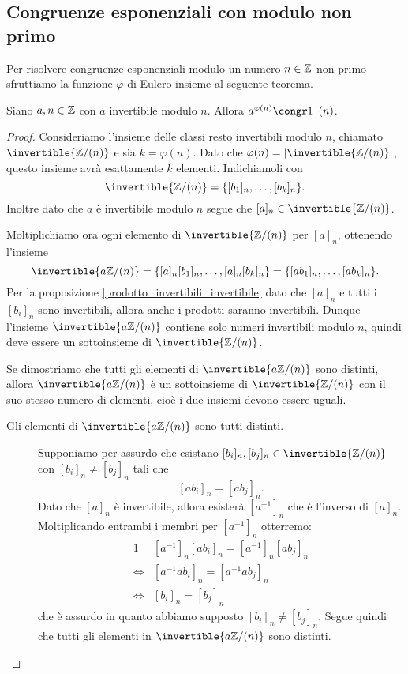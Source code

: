 \subsection{Congruenze esponenziali con modulo non primo}

Per risolvere congruenze esponenziali modulo un numero $n \in \mathbb{Z}$ non primo sfruttiamo la funzione $\varphi$ di Eulero insieme al seguente teorema.

\begin{theorem}
     \label{th_Eulero}
    Siano $a, n \in \mathbb{Z}$ con $a$ invertibile modulo $n$. Allora $a^{\varphi(n)} \congr 1 \Mod{n}$.
\end{theorem}
\begin{proof}
    Consideriamo l'insieme delle classi resto invertibili modulo $n$, chiamato $\invertible{\Z/(n)}$ e sia $k = \varphi(n)$. Dato che $\varphi(n) = \abs{\invertible{\Z/(n)}}$, questo insieme avrà esattamente $k$ elementi. Indichiamoli con \[
        \invertible{\Z/(n)} = \{[b_1]_n, \dots, [b_k]_n\}.   
    \]
    Inoltre dato che $a$ è invertibile modulo $n$ segue che $[a]_n \in \invertible{\Z/(n)}$. 

    Moltiplichiamo ora ogni elemento di $\invertible{\Z/(n)}$ per $[a]_n$, ottenendo l'insieme \[
        \invertible{a\Z/(n)} = \{[a]_n[b_1]_n, \dots, [a]_n[b_k]_n\} = \{[ab_1]_n, \dots, [ab_k]_n\}.
    \]
    Per la proposizione \ref{prodotto_invertibili_invertibile} dato che $[a]_n$ e tutti i $[b_i]_n$ sono invertibili, allora anche i prodotti saranno invertibili. Dunque l'insieme $\invertible{a\Z/(n)}$ contiene solo numeri invertibili modulo $n$, quindi deve essere un sottoinsieme di $\invertible{\Z/(n)}$.

    Se dimostriamo che tutti gli elementi di $\invertible{a\Z/(n)}$ sono distinti, allora $\invertible{a\Z/(n)}$ è un sottoinsieme di $\invertible{\Z/(n)}$ con il suo stesso numero di elementi, cioè i due insiemi devono essere uguali.

    \begin{description}
        \item[Gli elementi di $\invertible{a\Z/(n)}$ sono tutti distinti.] Supponiamo per assurdo che esistano $[b_i]_n, [b_j]_n \in \invertible{\Z/(n)}$ con $[b_i]_n \neq [b_j]_n$ tali che \[
            [ab_i]_n = [ab_j]_n.
        \]
        Dato che $[a]_n$ è invertibile, allora esisterà $[a^{-1}]_n$ che è l'inverso di $[a]_n$. Moltiplicando entrambi i membri per $[a^{-1}]_n$ otterremo: \begin{alignat*}
            {1}
            &[a^{-1}]_n[ab_i]_n = [a^{-1}]_n[ab_j]_n \\
            \iff &[a^{-1}ab_i]_n = [a^{-1}ab_j]_n \\
            \iff &[b_i]_n = [b_j]_n 
        \end{alignat*}
        che è assurdo in quanto abbiamo supposto $[b_i]_n \neq [b_j]_n$. Segue quindi che tutti gli elementi in $\invertible{a\Z/(n)}$ sono distinti.
    \end{description}


\end{proof}
